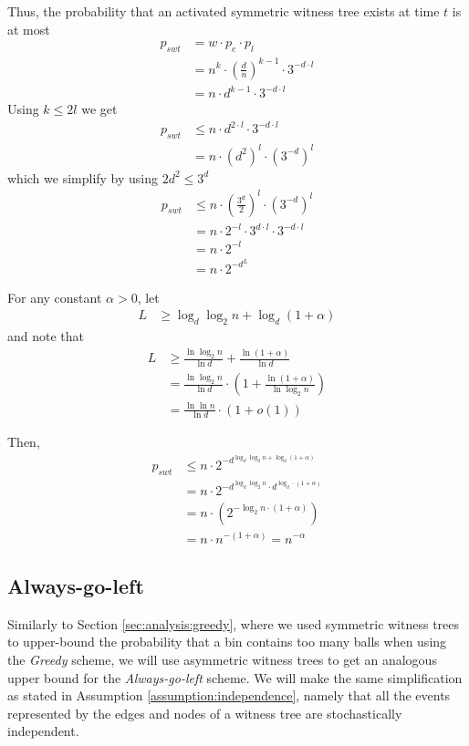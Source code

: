 \documentclass[a4paper,12pt]{article}
\begin{document}
Thus, the probability that an activated symmetric witness tree exists at time $t$ is at most 
\begin{align}
p_{swt} &= w \cdot p_e \cdot p_l \\
		&= n^{k} \cdot \left(\frac{d}{n}\right)^{k-1} \cdot 3^{-d \cdot l} \\
		&= n \cdot d^{k-1} \cdot 3^{-d \cdot l}
\end{align}
Using $k \leq 2l$ we get
\begin{align}
p_{swt} &\leq n \cdot d^{2\cdot l} \cdot 3^{-d \cdot l} \\
		&= n \cdot \left(d^2\right)^l \cdot \left( 3^{-d} \right)^l
\end{align}
which we simplify by using $2d^2 \leq 3^d$
\begin{align}
p_{swt} &\leq n \cdot \left(\frac{3^d}{2}\right)^l \cdot \left( 3^{-d}\right)^l \\
		&= n \cdot 2^{-l} \cdot 3^{d\cdot l} \cdot 3^{-d \cdot l} \\
		&= n\cdot 2^{-l}		\\
		&= n\cdot 2^{-d^L}		
\end{align}

For any constant $\alpha > 0 $, let
\begin{align}
L &\geq \log_d\log_2 n + \log_d\left(1+\alpha\right)
\end{align}
and note that
\begin{align}
L &\geq  \frac{\ln\log_2 n}{\ln d} + \frac{\ln(1+\alpha)}{\ln d} \\
   &= \frac{\ln \log_2 n}{\ln d} \cdot \left(1 + \frac{\ln\left(1+\alpha\right)}{\ln \log_2 n}\right) \\
  &=  \frac{\ln \ln n}{\ln d} \cdot \left( 1+ o\left( 1\right)\right)
\end{align}

Then, 
\begin{align}
p_{swt} &\leq n \cdot 2^{{-d}^{\log_d\log_2 n + \log_d\left(1+\alpha\right)}} \\
		&= n \cdot 2^{-{d}^{\log_d\log_2 n}\cdot d^{\log_d \cdot\left(1+\alpha\right)}} \\
		&= n \cdot \left( 2^{-\log_2 n \cdot \left(1+ \alpha \right)} \right) \\
		&= n \cdot n^{-\left(1+\alpha\right)} = n^{-\alpha}
\end{align}



\subsection{Always-go-left}
\label{sec:analysis:alg}
Similarly to Section \ref{sec:analysis:greedy}, where we used symmetric witness trees to upper-bound the probability that a bin contains too many balls when using the \emph{Greedy} scheme, we will use asymmetric witness trees to get an analogous upper bound for the \emph{Always-go-left} scheme. We will make the same simplification as stated in Assumption \ref{assumption:independence}, namely that all the events represented by the edges and nodes of a witness tree are stochastically independent.
\end{document}
